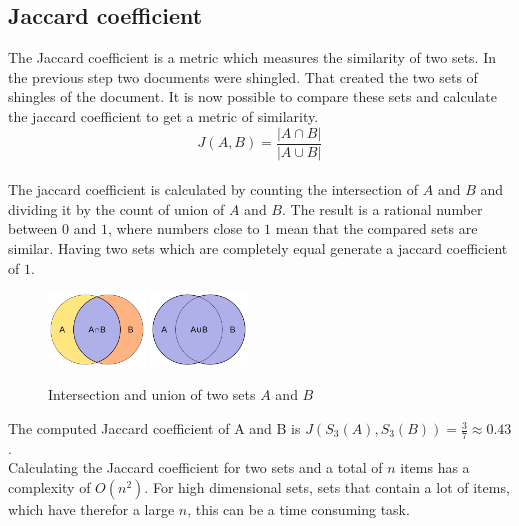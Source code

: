 \subsection{Jaccard coefficient}

The Jaccard coefficient is a metric which measures the similarity of two sets. In the previous step two documents were shingled. That created the two sets of shingles of the document. It is now possible to compare these sets and calculate the jaccard coefficient to get a metric of similarity.\\

\begin{equation}
    J(A,B) = \frac{ | A \cap B | }{ | A \cup B | }
\end{equation}\\

The jaccard coefficient is calculated by counting the intersection of $ A $ and $ B $ and dividing it by the count of union of $ A $ and $ B $. The result is a rational number between $ 0 $ and $ 1 $, where numbers close to $ 1 $ mean that the compared sets are similar. Having two sets which are completely equal generate a jaccard coefficient of $ 1 $.\\

\begin{figure}[H]
    \centering
    \includegraphics[width=0.23\textwidth]{images/Intersection_of_sets_A_and_B.png} 
    \includegraphics[width=0.23\textwidth]{images/Union_of_sets_A_and_B.png}
    \caption{Intersection and union of two sets $ A $ and $ B $ \cite{intersectionImage,unionImage}}
\end{figure}

The computed Jaccard coefficient of A and B is  $ J(S_3(A),S_3(B)) = \frac{3}{7} \approx 0.43 $.\\

Calculating the Jaccard coefficient for two sets and a total of $ n $ items has a complexity of $ O(n^2) $. For high dimensional sets, sets that contain a lot of items, which have therefor a large $ n $, this can be a time consuming task.\\

